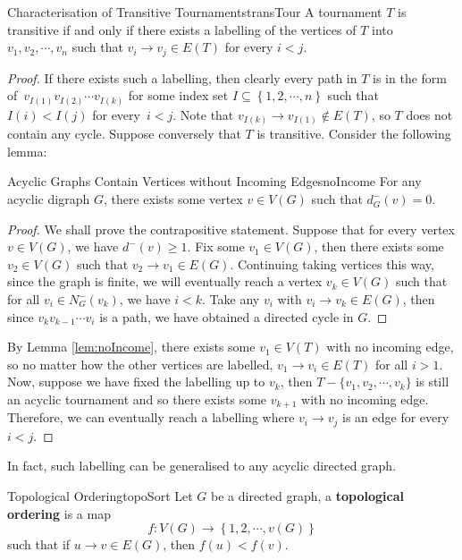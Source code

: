 \documentclass[math]{amznotes}
\theoremstyle{remark}
\begin{document}
\begin{probox}{Characterisation of Transitive Tournaments}{transTour}
    A tournament $T$ is transitive if and only if there exists a labelling of the vertices of $T$ into~$v_1, v_2, \cdots, v_n$ such that $v_i \to v_j \in E(T)$ for every $i < j$.
    \tcblower
    \begin{proof}
        If there exists such a labelling, then clearly every path in $T$ is in the form of~$v_{I(1)}v_{I(2)}\cdots v_{I(k)}$ for some index set $I \subseteq \left\{1, 2, \cdots, n\right\}$ such that $I(i) < I(j)$ for every~$i < j$. Note that $v_{I(k)} \to v_{I(1)} \notin E(T)$, so $T$ does not contain any cycle. Suppose conversely that $T$ is transitive. Consider the following lemma:
        \begin{lembox}{Acyclic Graphs Contain Vertices without Incoming Edges}{noIncome}
            For any acyclic digraph $G$, there exists some vertex $v \in V(G)$ such that $d^-_G(v) = 0$.
            \tcblower
            \begin{proof}
                We shall prove the contrapositive statement. Suppose that for every vertex $v \in V(G)$, we have $d^-(v) \geq 1$. Fix some $v_1 \in V(G)$, then there exists some~$v_2 \in V(G)$ such that $v_2 \to v_1 \in E(G)$. Continuing taking vertices this way, since the graph is finite, we will eventually reach a vertex $v_k \in V(G)$ such that for all $v_i \in N_G^-(v_k)$, we have $i < k$. Take any $v_i$ with $v_i \to v_k \in E(G)$, then since $v_kv_{k - 1}\cdots v_i$ is a path, we have obtained a directed cycle in $G$.
            \end{proof}
        \end{lembox}
        By Lemma \ref{lem:noIncome}, there exists some $v_1 \in V(T)$ with no incoming edge, so no matter how the other vertices are labelled, $v_1 \to v_i \in E(T)$ for all $i > 1$. Now, suppose we have fixed the labelling up to $v_k$, then $T - \{v_1, v_2, \cdots, v_k\}$ is still an acyclic tournament and so there exists some $v_{k + 1}$ with no incoming edge. Therefore, we can eventually reach a labelling where $v_i \to v_j$ is an edge for every $i < j$.
    \end{proof}
\end{probox}
In fact, such labelling can be generalised to any acyclic directed graph.
\begin{dfnbox}{Topological Ordering}{topoSort}
    Let $G$ be a directed graph, a {\color{red} \textbf{topological ordering}} is a map 
    \begin{equation*}
        f \colon V(G) \to \left\{1, 2, \cdots, v(G)\right\}
    \end{equation*}
    such that if $u \to v \in E(G)$, then $f(u) < f(v)$.
\end{dfnbox}
\end{document}

